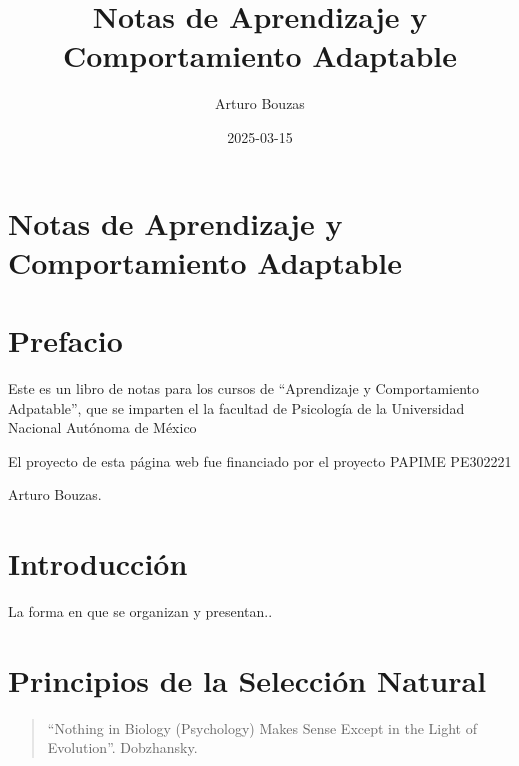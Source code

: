 \documentclass[
  letterpaper,
]{book}
\title{Notas de Aprendizaje y Comportamiento Adaptable}
\author{Arturo Bouzas}
\date{2025-03-15}
\renewcommand*\contentsname{Tabla de contenidos}
\newcommand\contentsname{Tabla de contenidos}
\begin{document}
\frontmatter
\maketitle

\renewcommand*\contentsname{Tabla de contenidos}
{
\hypersetup{linkcolor=}
\setcounter{tocdepth}{2}
\tableofcontents
}
\mainmatter
{}

\chapter{Notas de Aprendizaje y Comportamiento
Adaptable}\label{notas-de-aprendizaje-y-comportamiento-adaptable}


\chapter*{Prefacio}\label{prefacio}


Este es un libro de notas para los cursos de ``Aprendizaje y
Comportamiento Adpatable'', que se imparten el la facultad de Psicología
de la Universidad Nacional Autónoma de México

El proyecto de esta página web fue financiado por el proyecto PAPIME
PE302221

Arturo Bouzas.


\chapter*{Introducción}\label{introducciuxf3n}


La forma en que se organizan y presentan..


\chapter{Principios de la Selección
Natural}\label{principios-de-la-selecciuxf3n-natural}

\begin{quote}
``Nothing in Biology (Psychology) Makes Sense Except in the Light of
Evolution''. Dobzhansky.
\end{quote}
\end{document}
